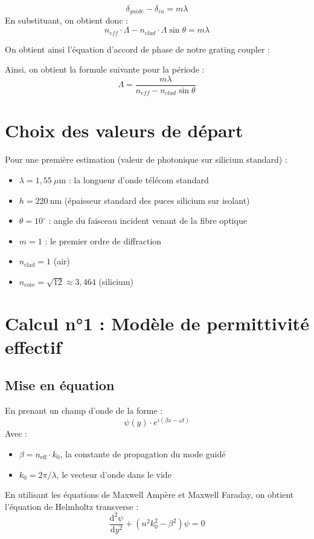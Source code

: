 \documentclass[a4paper,11pt]{report}
\begin{document}
\begin{equation}
\delta_{guide} - \delta_{in} = m\lambda
\label{eq:diff_marche}
\end{equation}
En substituant, on obtient donc :
\begin{equation}
n_{eff}\cdot\Lambda - n_{clad}\cdot\Lambda\sin\theta = m\lambda
\label{eq:accord_phase}
\end{equation}

On obtient ainsi l'équation d'accord de phase de notre grating coupler :

Ainsi, on obtient la formule suivante pour la période :
\begin{equation}
\boxed{\Lambda = \frac{m\lambda}{n_{eff} - n_{clad}\sin\theta}}
\label{eq:lambda_theorique}
\end{equation}

\section{Choix des valeurs de départ}
Pour une première estimation (valeur de photonique sur silicium standard) :
\begin{itemize}
    \item $\lambda = 1{,}55~\mu\text{m}$ : la longueur d'onde télécom standard 
    \item $h = 220 ~\text{nm}$ (épaisseur standard des puces silicium sur isolant)
    \item $\theta = 10^\circ$ : angle du faisceau incident venant de la fibre optique
    \item $m = 1$ : le premier ordre de diffraction
    \item $n_{\text{clad}} = 1$ (air)
    \item $n_{\text{core}} = \sqrt{12} \approx 3{,}464$ (silicium)

\end{itemize}

\section{Calcul n°1 : Modèle de permittivité effectif}
\label{sec:calcul_neff}

\subsection*{Mise en équation}

En prenant un champ d'onde de la forme :
\begin{equation}
\psi(y) \cdot e^{i (\beta x - \omega t)}
\end{equation}
Avec :
\begin{itemize}
    \item $\beta=n_{\text{eff}}\cdot k_0$, la constante de propagation du mode guidé
    \item $k_0=2\pi/\lambda$, le vecteur d'onde dans le vide
\end{itemize}
En utilisant les équations de Maxwell Ampère et Maxwell Faraday, on obtient l'équation de Helmholtz transverse :
\begin{equation}
\frac{\text{d}^2\psi}{\text{d}y^2} + (n^2 k_0^2 - \beta^2) \psi = 0
\end{equation}
\end{document}
